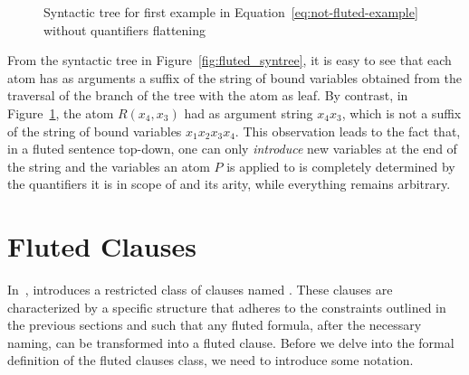 \begin{figure}[H]
    \centering
    \caption{Syntactic tree for first example in Equation~\ref{eq:not-fluted-example} without quantifiers flattening}\label{fig:not_fluted_syntree}
\end{figure}

From the syntactic tree in Figure~\ref{fig:fluted_syntree}, it is easy to see that each atom has as arguments a suffix of the string of bound variables obtained from the traversal of the branch of the tree with the atom as leaf.
By contrast, in Figure~\ref{fig:not_fluted_syntree}, the atom \(R(x_4, x_3)\) had as argument string \(x_4 x_3\), which is not a suffix of the string of bound variables \(x_1 x_2 x_3 x_4\).
This observation leads to the fact that, in  a fluted sentence top-down, one can only \emph{introduce} new variables at the end of the string and the variables an atom \(P\) is applied to is completely determined by the quantifiers it is in scope of and its arity, while everything remains arbitrary.

\section{Fluted Clauses}\label{sec:fluted-clauses}

In~\cite{schmidt2000resolution}, \citeauthor{schmidt2000resolution} introduces a restricted class of clauses named .
These clauses are characterized by a specific structure that adheres to the constraints outlined in the previous sections and such that any fluted formula, after the necessary naming, can be transformed into a fluted clause.
Before we delve into the formal definition of the fluted clauses class, we need to introduce some notation.

